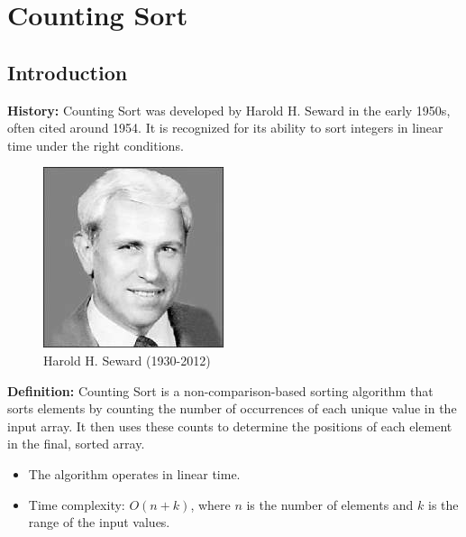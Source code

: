 \section{Counting Sort}

\subsection{Introduction}
\textbf{History:}
Counting Sort was developed by Harold H. Seward in the early 1950s, often cited around 1954. It is recognized for its ability to sort integers in linear time under the right conditions.

\begin{figure}[H]
\centering
\includegraphics[scale=1]{img/haroldHSeward.jpg}
\caption{Harold H. Seward (1930-2012)}
\label{fig:harold_h_seward}
\end{figure}

\textbf{Definition:}
Counting Sort is a non-comparison-based sorting algorithm that sorts elements by counting the number of occurrences of each unique value in the input array. It then uses these counts to determine the positions of each element in the final, sorted array.

\begin{itemize}
    \item The algorithm operates in linear time.
    \item Time complexity: \(O(n + k)\), where \(n\) is the number of elements and \(k\) is the range of the input values.
\end{itemize}

